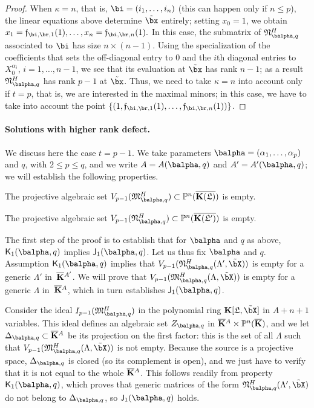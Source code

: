 \documentclass[12pt]{article}
\begin{document}
\begin{proof}
  When $\kappa=n$, that is, $\bi=(i_1,\dots,i_n)$ (this can happen
  only if $n \le p$), the linear equations above determine $\tilde\bx$
  entirely; setting $x_0=1$, we obtain
  $x_{1}=\mathfrak{f}_{\bi,\br,1}(1),\dots,x_{n}=\mathfrak{f}_{\bi,\br,n}(1).$
  In this case, the submatrix of $\mathfrak{N}^H_{\balpha,q}$
  associated to $\bi$ has size $n \times (n-1)$. Using the
  specialization of the coefficients that sets the off-diagonal entry
  to $0$ and the $i$th diagonal entries to $X_0^{\alpha_i}$,
  $i=1,\dots,n-1$, we see that its evaluation at $\tilde\bx$ has rank
  $n-1$; as a result $\mathfrak{N}^H_{\balpha,q}$ has rank $p-1$ at
  $\tilde \bx$. Thus, we need to take $\kappa=n$ into account only if
  $t=p$, that is, we are interested in the maximal minors; in this
  case, we have to take into account the point $\left \{
  (1,\mathfrak{f}_{\bi,\br,1}(1),\dots,\mathfrak{f}_{\bi,\br,n}(1))\right
  \}$.
\end{proof}


\paragraph{Solutions with higher rank defect.} 
We discuss here the case $t=p-1$.  We take parameters
$\balpha=(\alpha_1,\dots,\alpha_p)$ and $q$, with $2 \le p \le q$, and
we write $A=A(\balpha,q)$ and $A'=A'(\balpha,q)$; we will establish
the following properties.
\begin{description}[leftmargin=*]
\item[$\assI_1(\balpha,q).$] The projective algebraic set
  $V_{p-1}(\mathfrak{M}^H_{\balpha,q})\subset\P^n(\KKGbar)$ is empty.
\item[$\assJ_1(\balpha,q).$] The projective algebraic set
  $V_{p-1}(\mathfrak{N}^H_{\balpha,q})\subset\P^n(\KKGpbar)$ is empty.
\end{description}
The first step of the proof is to establish that for $\balpha$ and $q$
as above, $\assJ_1(\balpha,q)$ implies $\assI_1(\balpha,q)$. Let us
thus fix $\balpha$ and $q$.  Assumption $\assJ_1(\balpha,q)$ implies
that $V_{p-1}(\mathfrak{N}^H_{\balpha,q}(\Lambda',\tilde\bX))$ is
empty for a generic $\Lambda'$ in~$\overline{\mathbf{K}}{}^{A'}$.  We will prove that
$V_{p-1}(\mathfrak{M}^H_{\balpha,q}(\Lambda,\tilde\bX))$ is empty for
a generic $\Lambda$ in~$\overline{\mathbf{K}}{}^A$, which in turn establishes
$\assI_1(\balpha,q)$.


Consider the ideal $I_{p-1}(\mathfrak{M}^H_{\balpha,q})$ in the polynomial
ring $\KK[\mathfrak{L},\tilde\bX]$ in $A+n+1$ variables. This ideal
defines an algebraic set $Z_{\balpha,q}$ in $\overline{\mathbf{K}}{}^A \times
\mathbb{P}^n(\overline{\mathbf{K}})$, and we let $\Delta_{\balpha,q} \subset \KKbar{}^A$ be its
projection on the first factor: this is the set of all $\Lambda$ such that
$V_{p-1}(\mathfrak{M}^H_{\balpha,q}(\Lambda,\tilde\bX))$ is not empty. Because the source is
a projective space, $\Delta_{\balpha,q}$ is closed (so its complement is
open), and we just have to verify that it is not equal to the whole
$\overline{\mathbf{K}}{}^A$. This follows readily from property $\assJ_1(\balpha,q)$,
which proves that generic matrices of the form
$\mathfrak{N}^H_{\balpha,q}(\Lambda',\tilde\bX)$ do not belong to $\Delta_{\balpha,q}$, so 
$\assI_1(\balpha,q)$ holds.
\end{document}
